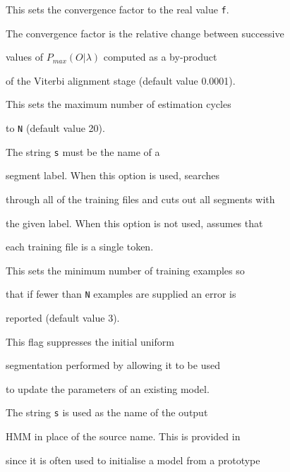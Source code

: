 \begin{optlist}





   This sets the convergence factor to the real value {\tt f}.


      The convergence factor is the relative change between successive


      values of $P_{max}({O}|\lambda)$ computed as a by-product


      of the Viterbi alignment stage (default value 0.0001).





   This sets the maximum number of estimation cycles


      to {\tt N} (default value 20).





   The string {\tt s} must be the name of a


      segment label.  When this option is used,  searches


      through all of the training files and cuts out all segments with


      the given label.  When this option is not used,  assumes that


      each training file is a single token.





    This sets the minimum number of training examples so


      that if fewer than {\tt N} examples are supplied an error is


      reported (default value 3).





    This flag suppresses the initial uniform


      segmentation performed by  allowing it to be used


      to update the parameters of an existing model.


  


    The string {\tt s} is used as the name of the output


      HMM in place of the source name.  This is provided in 


      since it is often used to initialise a model from a prototype



\end{optlist}
